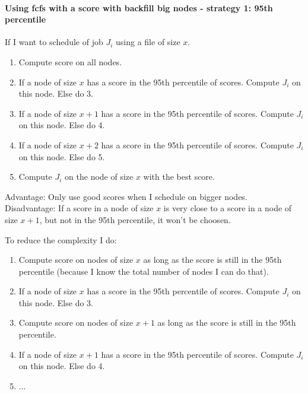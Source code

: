 \documentclass[a4paper]{article}
\begin{document}
\paragraph{Using fcfs with a score with backfill big nodes - strategy 1: 95th percentile}
If I want to schedule of job $J_i$ using a file of size $x$.
\begin{enumerate}
	\item Compute score on all nodes.
	\item If a node of size $x$ has a score in the 95th percentile of scores. Compute $J_i$ on this node. Else do 3.
	\item If a node of size $x+1$ has a score in the 95th percentile of scores. Compute $J_i$ on this node. Else do 4.
	\item If a node of size $x+2$ has a score in the 95th percentile of scores. Compute $J_i$ on this node. Else do 5.
	\item Compute $J_i$ on the node of size $x$ with the best score.
\end{enumerate}
Advantage: Only use good scores when I schedule on bigger nodes.\\
Disadvantage: If a score in a node of size $x$ is very close to a score in a node of size $x+1$, but not in the 95th percentile, it won't be choosen.

To reduce the complexity I do:
\begin{enumerate}
	\item Compute score on nodes of size $x$ as long as the score is still in the 95th percentile (because I know the total number of nodes I can do that).
	\item If a node of size $x$ has a score in the 95th percentile of scores. Compute $J_i$ on this node. Else do 3.
	\item Compute score on nodes of size $x+1$ as long as the score is still in the 95th percentile.
	\item If a node of size $x+1$ has a score in the 95th percentile of scores. Compute $J_i$ on this node. Else do 4.
	\item ...
\end{enumerate}
\end{document}
